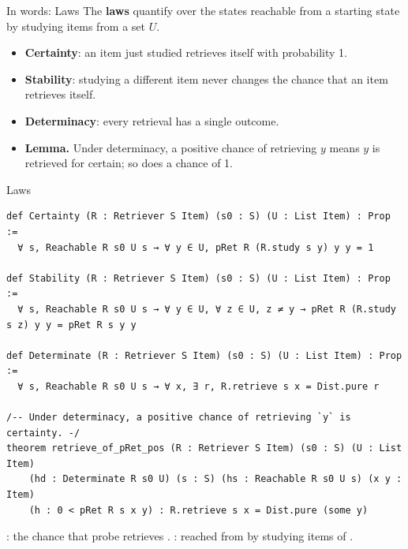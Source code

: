 \documentclass[aspectratio=169,11pt]{beamer}
\begin{document}
\begin{frame}{In words: Laws}
  The \textbf{laws} quantify over the states reachable from a starting state by studying items from a set $U$.
  \begin{itemize}
    \item \textbf{Certainty}: an item just studied retrieves itself with probability 1.
    \item \textbf{Stability}: studying a different item never changes the chance that an item retrieves itself.
    \item \textbf{Determinacy}: every retrieval has a single outcome.
    \item \textbf{Lemma.} Under determinacy, a positive chance of retrieving $y$ means $y$ is retrieved for certain; so does a chance of 1.
  \end{itemize}
\end{frame}


\begin{frame}[fragile]{Laws}
\begin{Verbatim}
def Certainty (R : Retriever S Item) (s0 : S) (U : List Item) : Prop :=
  ∀ s, Reachable R s0 U s → ∀ y ∈ U, pRet R (R.study s y) y y = 1

def Stability (R : Retriever S Item) (s0 : S) (U : List Item) : Prop :=
  ∀ s, Reachable R s0 U s → ∀ y ∈ U, ∀ z ∈ U, z ≠ y → pRet R (R.study s z) y y = pRet R s y y

def Determinate (R : Retriever S Item) (s0 : S) (U : List Item) : Prop :=
  ∀ s, Reachable R s0 U s → ∀ x, ∃ r, R.retrieve s x = Dist.pure r

/-- Under determinacy, a positive chance of retrieving `y` is certainty. -/
theorem retrieve_of_pRet_pos (R : Retriever S Item) (s0 : S) (U : List Item)
    (hd : Determinate R s0 U) (s : S) (hs : Reachable R s0 U s) (x y : Item)
    (h : 0 < pRet R s x y) : R.retrieve s x = Dist.pure (some y)
\end{Verbatim}
  \medskip
  \small {}: the chance that probe  retrieves . : reached from  by studying items of .
\end{frame}
\end{document}
